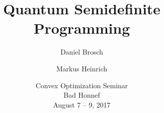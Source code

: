\pgfplotsset{compat=1.14}


\newcommand{\cmark}{\ding{51}}%
\newcommand{\xmark}{\ding{55}}%
\newcommand{\done}{\rlap{$\square$}{\raisebox{2pt}{\large\hspace{1pt}\cmark}}%
\hspace{-2.5pt}}

\author{Daniel Brosch \and Markus Heinrich}
\title{Quantum Semidefinite Programming}
\date{
  Convex Optimization Seminar \\
  Bad Honnef \\
  August 7 -- 9, 2017
}

\newcommand{\ie}{i.\,e.}
\newcommand{\Ie}{I.\,e.}
\newcommand{\eg}{e.\,g.}
\newcommand{\Eg}{E.\,g.} 

\newcommand{\R}{\mathbb{R}}
\newcommand{\N}{\mathbb{N}}
\newcommand{\C}{\mathbb{C}}
\newcommand{\Z}{\mathbb{Z}}

\DeclareMathOperator{\Ric}{Ric}
\DeclareMathOperator{\Tr}{Tr}
\DeclareMathOperator{\sgn}{sgn}
\DeclareMathOperator{\Con}{Con}
\DeclareMathOperator{\oracle}{ORACLE}

\newcommand{\id}{\mathrm{id}}
\newcommand{\dd}{\,\mathrm{d}}

\newcommand{\Orth}{O}
\newcommand{\SOrth}{SO}
\newcommand{\orth}{\mathfrak{O}}
\newcommand{\sorth}{\mathfrak{so}}
\newcommand{\Conf}{\mathrm{CO}}
\newcommand{\conf}{\mathfrak{co}}
\newcommand{\U}{U}
\newcommand{\SU}{SU}

\newcommand{\vect}[1]{{\boldsymbol{#1}}}
\newcommand{\const}{\text{const}}
\newcommand{\Op}{\mathcal{O}}
\newcommand{\T}{\mathbb{T}}
\newcommand{\Sp}{\mathbb{Sp}}
\newcommand{\A}{\mathcal{A}}
\newcommand{\V}{\mathcal{V}}
\newcommand{\F}{\mathcal{F}}
\newcommand{\G}{\mathcal{G}}
\newcommand{\D}{\mathcal{D}}
\newcommand{\f}{\tilde{f}}
\newcommand{\aM}{\overline{a}}
\newcommand{\TM}{\overline{T}}
\newcommand{\JM}{\overline{J}_y}

\newcommand{\slashedd}[1]{#1\!\!\!/}